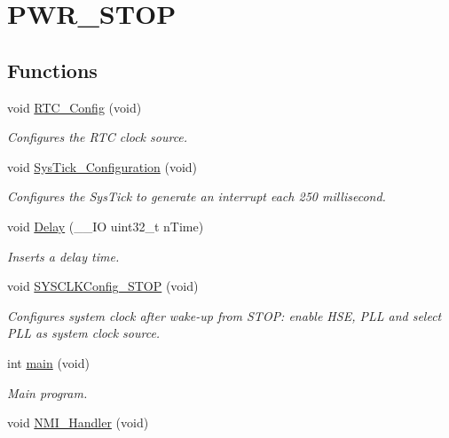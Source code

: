 \hypertarget{group___p_w_r___s_t_o_p}{\section{P\-W\-R\-\_\-\-S\-T\-O\-P}
\label{group___p_w_r___s_t_o_p}
}
\subsection*{Functions}
\begin{DoxyCompactItemize}
\item 
void \hyperlink{group___p_w_r___s_t_o_p_ga6cf25ba7a40c18ade0992a68cb342dcb}{R\-T\-C\-\_\-\-Config} (void)
\begin{DoxyCompactList}\small\item\em Configures the R\-T\-C clock source. \end{DoxyCompactList}\item 
void \hyperlink{group___p_w_r___s_t_o_p_ga54b9c153170b49545c7da9508e8466a7}{Sys\-Tick\-\_\-\-Configuration} (void)
\begin{DoxyCompactList}\small\item\em Configures the Sys\-Tick to generate an interrupt each 250 millisecond. \end{DoxyCompactList}\item 
void \hyperlink{group___p_w_r___s_t_o_p_gadf6ebc82af142bc201d3eb70e107f52e}{Delay} (\-\_\-\-\_\-\-I\-O uint32\-\_\-t n\-Time)
\begin{DoxyCompactList}\small\item\em Inserts a delay time. \end{DoxyCompactList}\item 
void \hyperlink{group___p_w_r___s_t_o_p_ga4d514c951d80aacaecfb4070f5e51c51}{S\-Y\-S\-C\-L\-K\-Config\-\_\-\-S\-T\-O\-P} (void)
\begin{DoxyCompactList}\small\item\em Configures system clock after wake-\/up from S\-T\-O\-P\-: enable H\-S\-E, P\-L\-L and select P\-L\-L as system clock source. \end{DoxyCompactList}\item 
int \hyperlink{group___p_w_r___s_t_o_p_ga840291bc02cba5474a4cb46a9b9566fe}{main} (void)
\begin{DoxyCompactList}\small\item\em Main program. \end{DoxyCompactList}\item 
void \hyperlink{group___p_w_r___s_t_o_p_ga6ad7a5e3ee69cb6db6a6b9111ba898bc}{N\-M\-I\-\_\-\-Handler} (void)

\end{DoxyCompactItemize}
